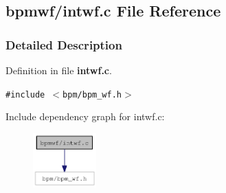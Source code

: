 \subsection{bpmwf/intwf.c File Reference}
\label{intwf_8c}


\subsubsection{Detailed Description}


Definition in file {\bf intwf.c}.

{\tt \#include $<$bpm/bpm\_\-wf.h$>$}\par


Include dependency graph for intwf.c:\nopagebreak
\begin{figure}[H]
\begin{center}
\leavevmode
\includegraphics[width=69pt]{intwf_8c__incl}
\end{center}
\end{figure}
